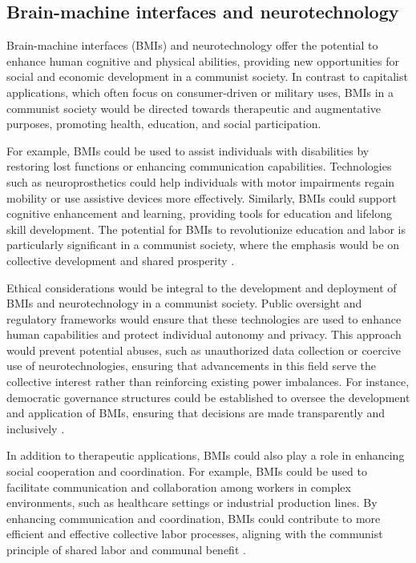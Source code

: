 \subsection{Brain-machine interfaces and neurotechnology}

Brain-machine interfaces (BMIs) and neurotechnology offer the potential to enhance human cognitive and physical abilities, providing new opportunities for social and economic development in a communist society. In contrast to capitalist applications, which often focus on consumer-driven or military uses, BMIs in a communist society would be directed towards therapeutic and augmentative purposes, promoting health, education, and social participation.

For example, BMIs could be used to assist individuals with disabilities by restoring lost functions or enhancing communication capabilities. Technologies such as neuroprosthetics could help individuals with motor impairments regain mobility or use assistive devices more effectively. Similarly, BMIs could support cognitive enhancement and learning, providing tools for education and lifelong skill development. The potential for BMIs to revolutionize education and labor is particularly significant in a communist society, where the emphasis would be on collective development and shared prosperity \cite[pp.~130-135]{rogers2018neurotechnology}.

Ethical considerations would be integral to the development and deployment of BMIs and neurotechnology in a communist society. Public oversight and regulatory frameworks would ensure that these technologies are used to enhance human capabilities and protect individual autonomy and privacy. This approach would prevent potential abuses, such as unauthorized data collection or coercive use of neurotechnologies, ensuring that advancements in this field serve the collective interest rather than reinforcing existing power imbalances. For instance, democratic governance structures could be established to oversee the development and application of BMIs, ensuring that decisions are made transparently and inclusively \cite[pp.~180-185]{diaz2018sustainability}.

In addition to therapeutic applications, BMIs could also play a role in enhancing social cooperation and coordination. For example, BMIs could be used to facilitate communication and collaboration among workers in complex environments, such as healthcare settings or industrial production lines. By enhancing communication and coordination, BMIs could contribute to more efficient and effective collective labor processes, aligning with the communist principle of shared labor and communal benefit \cite[pp.~300-305]{kim2021neuroscience}.


